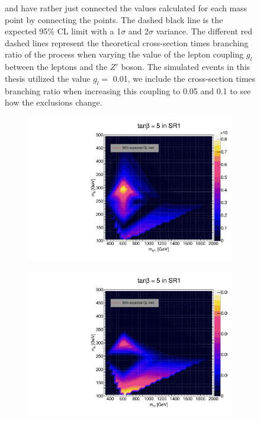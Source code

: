 \documentclass[12pt, a4paper]{book}
\begin{document}
\begin{figure}[!ht]
{   and have rather just connected the values calculated for each mass point by connecting the points. The dashed black line is the expected 95\% CL limit with a 1$\sigma$ and 2$\sigma$ variance. 
   The different red dashed lines represent the theoretical cross-section times branching ratio of the process when varying the value of the lepton coupling $g_l$ between the leptons and the $Z'$ boson. The simulated events in this thesis utilized the value $g_l=$ 0.01, we include the cross-section times branching ratio when increasing this coupling to 0.05 and 0.1 to see how the exclusions change.  }
\end{figure}

\begin{figure}[!ht]
	\centering
	\begin{subfigure}[b]{0.49\textwidth}
      \centering
      \includegraphics[width=1\textwidth]{Limits/Model_independent/50-100/2HDM/2HDM_ee_tb5.pdf}
   \end{subfigure}
   \hfill
   \begin{subfigure}[b]{0.49\textwidth}
      \centering
      \includegraphics[width=1\textwidth]{Limits/Model_independent/50-100/2HDM/2HDM_uu_tb5.pdf}

\end{subfigure}
\end{figure}
\end{document}
